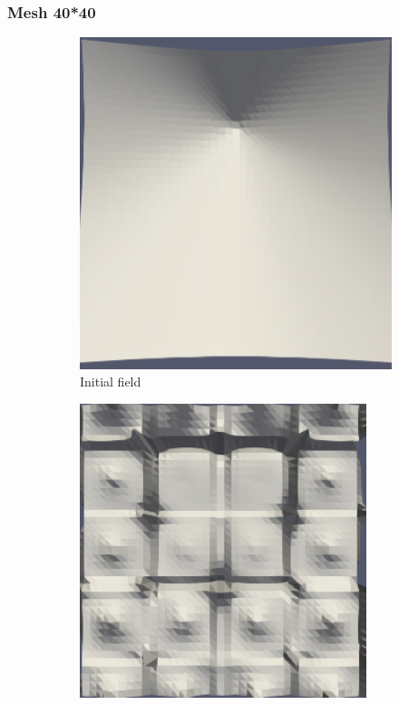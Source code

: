 \documentclass{article}
\begin{document}
\subsubsection{Mesh 40*40}
\begin{figure}[hbt!]
  \begin{subfigure}{0.4\textwidth}
        \centering
        \includegraphics[width=\textwidth]{Figures/e-4 40x40/for n 1.png}
        \caption{Initial field}
  \end{subfigure}
  \hfill
  \begin{subfigure}{0.4\textwidth}
        \centering
        \includegraphics[width=\textwidth]{Figures/e-4 40x40/for n 10.png}

\end{subfigure}
\end{figure}
\end{document}

